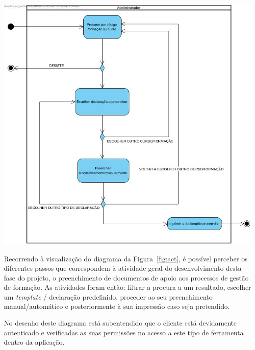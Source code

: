 \begin{center}
        \includegraphics[width=\textwidth,height=\textheight,keepaspectratio]{images/ActivityDiagram1.jpg}
        \label{fig:act}
\end{center}

Recorrendo à visualização do diagrama da Figura~\ref{fig:act}, é possível perceber os diferentes passos que correspondem à atividade geral do desenvolvimento desta fase do projeto, o preenchimento de documentos de apoio aos processos de gestão de formação. As atividades foram então: filtrar a procura a um resultado, escolher um \textit{template} / declaração predefinido, proceder ao seu preenchimento manual/automático e posteriormente à sua impressão caso seja pretendido.

No desenho deste diagrama está subentendido que o cliente está devidamente autenticado e verificadas as suas permissões no acesso a este tipo de ferramenta dentro da aplicação.
